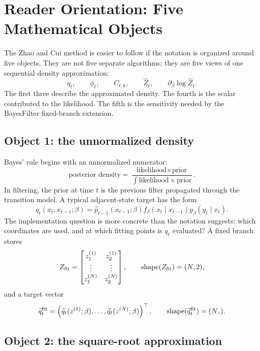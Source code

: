 \documentclass[11pt]{article}
\newcommand{\shape}{\operatorname{shape}}
\begin{document}
\section{Reader Orientation: Five Mathematical Objects}

The Zhao and Cui \cite{zhao2024ttsequential} method is easier to follow if the notation is organized around
five objects.  They are not five separate algorithms; they are five views of
one sequential density approximation:
\[
    q_t,\qquad \phi_t,\qquad C_{t,k},\qquad \widehat Z_t,
    \qquad \partial_\beta\log\widehat Z_t .
    \label{eq:p24-p22-o1}
\]
The first three describe the approximated density.  The fourth is the scalar
contributed to the likelihood.  The fifth is the sensitivity needed by the
BayesFilter fixed-branch extension.

\subsection*{Object 1: the unnormalized density}

Bayes' rule begins with an unnormalized numerator:
\[
    \text{posterior density}
    =
    \frac{\text{likelihood}\times\text{prior}}
    {\int \text{likelihood}\times\text{prior}}.
    \label{eq:p24-p22-o2}
\]
In filtering, the prior at time \(t\) is the previous filter propagated through
the transition model.  A typical adjacent-state target has the form
\[
    q_t(x_t,x_{t-1};\beta)
    =
    \widehat p_{t-1}(x_{t-1};\beta)
    f_\beta(x_t\mid x_{t-1})
    g_\beta(y_t\mid x_t).
    \label{eq:p24-p22-o3}
\]
The implementation question is more concrete than the notation suggests:
which coordinates are used, and at which fitting points is \(q_t\) evaluated?
A fixed branch stores
\[
    Z_{\rm fit}
    =
    \begin{bmatrix}
    z_1^{(1)} & z_2^{(1)}\\
    \vdots & \vdots\\
    z_1^{(N)} & z_2^{(N)}
    \end{bmatrix},
    \qquad
    \shape(Z_{\rm fit})=(N,2),
    \label{eq:p24-p22-o4}
\]
and a target vector
\[
    \widetilde q_t^{\rm fit}
    =
    \left(
    \widetilde q_t(z^{(1)};\beta),\ldots,
    \widetilde q_t(z^{(N)};\beta)
    \right)^\top,
    \qquad
    \shape(\widetilde q_t^{\rm fit})=(N,).
    \label{eq:p24-p22-o5}
\]

\subsection*{Object 2: the square-root approximation}
\end{document}
